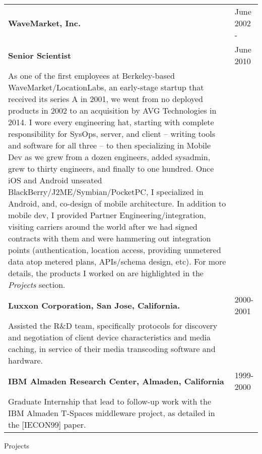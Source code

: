\begin{tabular}{p{5.2in}@{\hspace{1.5cm}}l}
	  
	\bf  WaveMarket, Inc.    & June 2002 -  \\
	\bf  Senior Scientist 	& June 2010 \\[4pt]
	
	   As one of the first employees at Berkeley-based WaveMarket/LocationLabs,
	   an early-stage startup that received its series A in 2001, 
	   we went from no deployed products in 2002 to an
	   acquisition by AVG Technologies in 2014.  I wore every engineering hat, starting with complete responsibility
	   for SysOps, server, and client -- writing tools and software for all three -- to
	   then specializing in Mobile Dev as we grew from a dozen engineers, added sysadmin, grew 
	   to thirty engineers, and finally to one hundred.  
	   Once iOS and Android unseated BlackBerry/J2ME/Symbian/PocketPC,
	   I specialized in Android, and, co-design of mobile architecture.  In addition to mobile dev, I provided
	   Partner Engineering/integration, visiting carriers around the world after we had signed contracts
	   with them and were hammering out integration points (authentication, location access, 
	   providing unmetered data atop metered plans, APIs/schema design, etc).
	   For more details, the products I worked on are highlighted in the {\em Projects} section. \\[9pt]
       	  
    \bf Luxxon Corporation, San Jose, California. & 2000-2001 \\[3pt]
       Assisted the R\&D team, specifically
       protocols for discovery and negotiation of client
       device characteristics and media caching, in service of their media transcoding
       software and hardware. \\[9pt]

    \bf IBM Almaden Research Center, 
          Almaden, California                         & 1999-2000 \\[3pt]
       Graduate Internship that lead to follow-up work with
       the IBM Almaden T-Spaces middleware project, as detailed in the [IECON99] paper. \\[9pt]


\end{tabular}



\medskip
\bigskip


\begin{bf} \large
Projects
\end{bf}
	   	   
